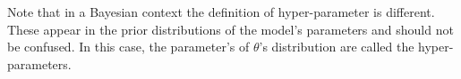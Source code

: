 Note that in a Bayesian context the definition of hyper-parameter is different. These appear in the  prior distributions of the model's parameters and should not be confused. In this case, the parameter's of $\theta$'s distribution are called the hyper-parameters. 



\textit{}

\textit{}

\textit{}

\textit{}

\textit{} 


